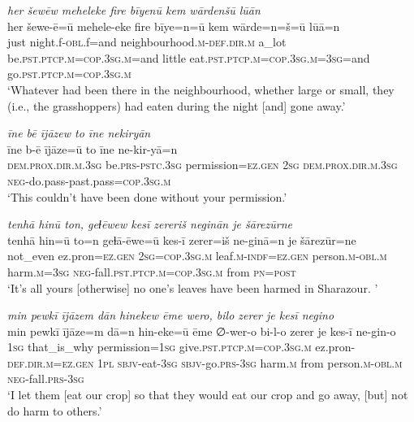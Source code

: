 \ea \label{PM.27}
\textit{her šewēw meheleke fire bīyenū kem wārdenšū lūān} \\ 
\gll her šewe-ē=ū mehele-eke fire bīye=n=ū kem wārde=n=š=ū lūā=n \\ 
 just night.f\textsc{-obl}.f=and neighbourhood\textsc{.m}\textsc{-def}\textsc{.dir}\textsc{.m} a\_lot be\textsc{.pst}\textsc{.ptcp}\textsc{.m}\textsc{=cop}\textsc{.3sg}\textsc{.m}=and little eat\textsc{.pst}\textsc{.ptcp}\textsc{.m}\textsc{=cop}\textsc{.3sg}\textsc{.m}\textsc{=3sg}=and go\textsc{.pst}\textsc{.ptcp}\textsc{.m}\textsc{=cop}\textsc{.3sg}\textsc{.m} \\ 
\glt `Whatever had been there in the neighbourhood, whether large or small, they (i.e., the grasshoppers) had eaten during the night [and] gone away.'
\z 
 
\ea \label{PM.30}
\textit{īne bē ījāzew to īne nekiryān} \\ 
\gll īne b-ē ījāze=ū to īne ne-kir-yā=n \\ 
 \textsc{dem.prox}\textsc{.dir}\textsc{.m}\textsc{.3sg} be\textsc{.prs}\textsc{-pstc}\textsc{.3sg} permission\textsc{\textsc{=ez.gen}} \textsc{2sg} \textsc{dem.prox}\textsc{.dir}\textsc{.m}\textsc{.3sg} \textsc{neg-}do.pass-past.pass\textsc{=cop}\textsc{.3sg}\textsc{.m} \\ 
\glt `This couldn’t have been done without your permission.'
\z 
 
\ea \label{PM.31}
\textit{tenhā hinū ton, geɫēwew kesī zereriš neginān je šārezūrne} \\ 
\gll tenhā hin=ū to=n geɫā-ēwe=ū kes-ī zerer=iš ne-ginā=n je šārezūr=ne \\ 
 not\_even ez.pron\textsc{\textsc{=ez.gen}} \textsc{2sg}\textsc{=cop}\textsc{.3sg}\textsc{.m} leaf\textsc{.m}\textsc{-indf}\textsc{\textsc{=ez.gen}} person\textsc{.m}\textsc{-obl}\textsc{.m} harm\textsc{.m}\textsc{=3sg} \textsc{neg-}fall\textsc{.pst}\textsc{.ptcp}\textsc{.m}\textsc{=cop}\textsc{.3sg}\textsc{.m} from \textsc{pn}\textsc{=\textsc{post}} \\ 
\glt `It’s all yours [otherwise] no one’s leaves have been harmed in Sharazour. '
\z 
 
\ea \label{PM.36}
\textit{min pewkī ījāzem dān hinekew ēme wero, bilo zerer je kesī negino} \\ 
\gll min pewkī ījāze=m dā=n hin-eke=ū ēme ∅-wer-o bi-l-o zerer je kes-ī ne-gin-o \\ 
 \textsc{1sg} that\_is\_why permission\textsc{=\textsc{1sg}} give\textsc{.pst}\textsc{.ptcp}\textsc{.m}\textsc{=cop}\textsc{.3sg}\textsc{.m} ez.pron\textsc{-def}\textsc{.dir}\textsc{.m}\textsc{\textsc{=ez.gen}} \textsc{1pl} \textsc{sbjv-}eat\textsc{-3sg} \textsc{sbjv-}go\textsc{.prs}\textsc{-3sg} harm\textsc{.m} from person\textsc{.m}\textsc{-obl}\textsc{.m} \textsc{neg-}fall\textsc{.prs}\textsc{-3sg} \\ 
\glt `I let them [eat our crop] so that they would eat our crop and go away, [but] not do harm to others.'
\z 
 
